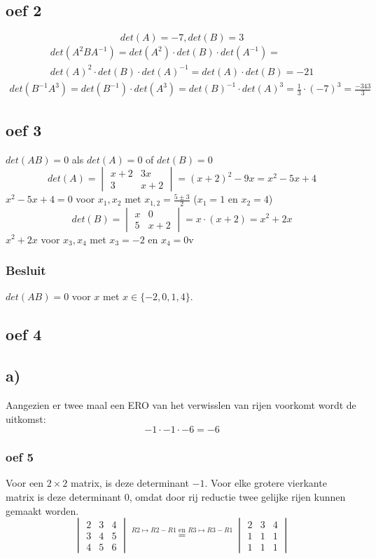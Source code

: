 \documentclass[10pt,a4paper]{article}
\begin{document}
\subsection*{oef 2}
\[det(A) = -7, det(B) = 3\]
\begin{gather*}
    det(A^2BA^{-1}) =
    det(A^2) \cdot det(B) \cdot det(A^{-1}) =\\
    det(A)^2 \cdot det(B) \cdot det(A)^{-1} = det(A) \cdot det(B) = -21
\end{gather*}
\begin{gather*}
    det(B^{-1}A^3) = det(B^{-1}) \cdot det(A^3) = det(B)^{-1} \cdot det(A)^3 = \frac{1}{3} \cdot (-7)^3 = \frac{-343}{3}
\end{gather*}

\subsection*{oef 3}
$det(AB) = 0$ als $det(A) = 0$ of $det(B) = 0$
\\
\[det(A) = \begin{vmatrix}
x + 2 & 3x\\
3 & x + 2
\end{vmatrix}
 = (x + 2)^2 - 9x = x^2 -5 x + 4
\]
$x^2 -5 x + 4 = 0$ voor $x_1, x_2$ met $x_{1,2} = \frac{5 \pm 3}{2}$ ($x_1 = 1$ en $x_2 = 4$)
\\
\[det(B) = \begin{vmatrix}
x & 0\\
5 & x + 2
\end{vmatrix}
 = x \cdot (x + 2) = x^2 + 2x\]
$x^2 + 2x$ voor $x_3, x_4$ met $x_3 = -2$ en $x_4 = 0$v 
\subsubsection*{Besluit}
$det(AB) = 0$ voor $x$ met $x \in \{-2, 0, 1, 4\}$.
\subsection*{oef 4}
\subsection*{a)}
Aangezien er twee maal een ERO van het verwisslen van rijen voorkomt wordt de uitkomst:
$$-1\cdot -1\cdot -6 = -6$$

\subsubsection*{oef 5}
Voor een $2\times2$ matrix, is deze determinant $-1$.
Voor elke grotere vierkante matrix is deze determinant $0$, omdat door rij reductie twee gelijke rijen kunnen gemaakt worden.
\[
\begin{vmatrix}
2 & 3 & 4\\
3 & 4 & 5\\
4 & 5 & 6
\end{vmatrix}
\overset{R2 \longmapsto R2-R1 \text{ en } R3 \longmapsto R3 - R1}{=}
\begin{vmatrix}
2 & 3 & 4\\
1 & 1 & 1\\
1 & 1 & 1
\end{vmatrix}
\]
\end{document}
